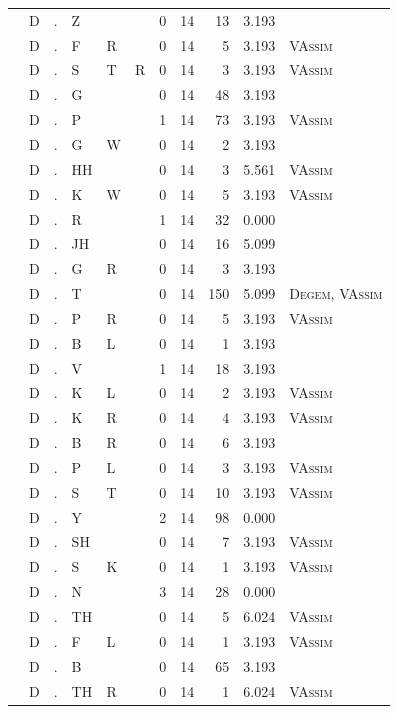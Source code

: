 \documentclass[12pt]{article}
\begin{document}
\begin{longtable}{r@{ } r@{ } c@{ } l@{ } l@{ } l@{ } r r r r l }
 & D & . & Z &  &  & 0 & 14 & 13 & 3.193 &  \\
 & D & . & F & R &  & 0 & 14 & 5 & 3.193 & \textsc{VAssim} \\
 & D & . & S & T & R & 0 & 14 & 3 & 3.193 & \textsc{VAssim} \\
 & D & . & G &  &  & 0 & 14 & 48 & 3.193 &  \\
 & D & . & P &  &  & 1 & 14 & 73 & 3.193 & \textsc{VAssim} \\
 & D & . & G & W &  & 0 & 14 & 2 & 3.193 &  \\
 & D & . & HH &  &  & 0 & 14 & 3 & 5.561 & \textsc{VAssim} \\
 & D & . & K & W &  & 0 & 14 & 5 & 3.193 & \textsc{VAssim} \\
 & D & . & R &  &  & 1 & 14 & 32 & 0.000 &  \\
 & D & . & JH &  &  & 0 & 14 & 16 & 5.099 &  \\
 & D & . & G & R &  & 0 & 14 & 3 & 3.193 &  \\
 & D & . & T &  &  & 0 & 14 & 150 & 5.099 & \textsc{Degem}, \textsc{VAssim} \\
 & D & . & P & R &  & 0 & 14 & 5 & 3.193 & \textsc{VAssim} \\
 & D & . & B & L &  & 0 & 14 & 1 & 3.193 &  \\
 & D & . & V &  &  & 1 & 14 & 18 & 3.193 &  \\
 & D & . & K & L &  & 0 & 14 & 2 & 3.193 & \textsc{VAssim} \\
 & D & . & K & R &  & 0 & 14 & 4 & 3.193 & \textsc{VAssim} \\
 & D & . & B & R &  & 0 & 14 & 6 & 3.193 &  \\
 & D & . & P & L &  & 0 & 14 & 3 & 3.193 & \textsc{VAssim} \\
 & D & . & S & T &  & 0 & 14 & 10 & 3.193 & \textsc{VAssim} \\
 & D & . & Y &  &  & 2 & 14 & 98 & 0.000 &  \\
 & D & . & SH &  &  & 0 & 14 & 7 & 3.193 & \textsc{VAssim} \\
 & D & . & S & K &  & 0 & 14 & 1 & 3.193 & \textsc{VAssim} \\
 & D & . & N &  &  & 3 & 14 & 28 & 0.000 &  \\
 & D & . & TH &  &  & 0 & 14 & 5 & 6.024 & \textsc{VAssim} \\
 & D & . & F & L &  & 0 & 14 & 1 & 3.193 & \textsc{VAssim} \\
 & D & . & B &  &  & 0 & 14 & 65 & 3.193 &  \\
 & D & . & TH & R &  & 0 & 14 & 1 & 6.024 & \textsc{VAssim} \\

\end{longtable}
\end{document}
